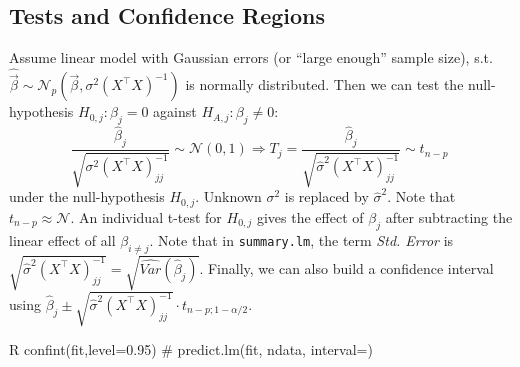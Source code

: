 \subsection{Tests and Confidence Regions}\label{subsec:tests_and_confidence_regions}
\begin{sectionbox}[T-test]\nospacing{}
  Assume linear model with Gaussian errors (or ``large enough'' sample size), s.t. $\hat{\vec{\beta}} \sim \mathcal{N}_{p}\left(\vec{\beta}, \sigma^{2}{(X^{\top}X)}^{-1}\right)$ is normally distributed.
  Then we can test the null-hypothesis $H_{0,j}: \beta_{j} = 0$ against $H_{A,j}: \beta_{j} \neq 0$:
  \[\frac{\hat \beta_{j}}{\sqrt{\sigma^{2}{{(X^{\top}X)}^{-1}_{jj}}}} \sim \mathcal{N}(0,1) \Rightarrow  T_{j} = \frac{\hat \beta_{j}}{\sqrt{\hat \sigma^{2}{{(X^{\top}X)}^{-1}_{jj}}}} \sim t_{n-p}\ \] under the null-hypothesis $H_{0,j}$. Unknown $\sigma^{2}$ is replaced by $\hat \sigma^{2}$. Note that $t_{n-p} \approx \mathcal{N}$.
  An individual t-test for $H_{0,j}$ gives the effect of $\beta_{j}$ after subtracting the linear effect of all $\beta_{i\neq j}$.
  Note that in \verb!summary.lm!, the term \emph{Std. Error} is $\sqrt{\hat \sigma^{2}{{(X^{\top}X)}^{-1}_{jj}}} = \sqrt{\hat{Var}(\hat \beta_{j})}$. Finally, we can also build a confidence interval using $\hat \beta_{j} \pm \sqrt{\hat \sigma^{2}{{(X^{\top}X)}^{-1}_{jj}}} \cdot t_{n-p;1-\alpha/2}$.
\begin{mintlinebox}{R}
  confint(fit,level=0.95) # predict.lm(fit, ndata, interval=)
\end{mintlinebox}
\end{sectionbox}

